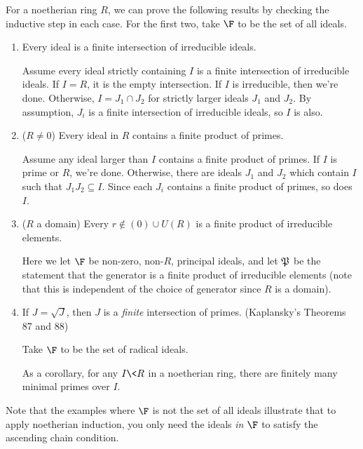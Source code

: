  \begin{example} For a noetherian ring $R$, we can prove the following results by
 checking the inductive step in each case. For the first two, take $\F$ to be the set of
 all ideals.
   \begin{enumerate}
     \item Every ideal is a finite intersection of irreducible ideals.

     Assume every ideal strictly containing $I$ is a finite intersection of irreducible
     ideals. If $I=R$, it is the empty intersection. If $I$ is irreducible, then we're
     done. Otherwise, $I = J_1\cap J_2$ for strictly larger ideals $J_1$ and $J_2$. By
     assumption, $J_i$ is a finite intersection of irreducible ideals, so $I$ is also.

     \item ($R\neq 0$) Every ideal in $R$ contains a finite product of primes.

     Assume any ideal larger than $I$ contains a finite product of primes. If $I$ is
     prime or $R$, we're done. Otherwise, there are ideals $J_1$ and $J_2$ which contain
     $I$ such that $J_1J_2\subseteq I$. Since each $J_i$ contains a finite product of
     primes, so does $I$.

     \item ($R$ a domain) Every $r\not\in (0)\cup U(R)$ is a finite product of
     irreducible elements.

     Here we let $\F$ be non-zero, non-$R$, principal ideals, and let $\P$ be the
     statement that the generator is a finite product of irreducible elements (note that
     this is independent of the choice of generator since $R$ is a domain). 

     \item If $J=\sqrt J$, then $J$ is a \emph{finite} intersection of primes.
     (Kaplansky's Theorems 87 and 88)

     Take $\F$ to be the set of radical ideals.

     As a corollary, for any $I\< R$ in a noetherian ring, there are finitely many
     minimal primes over $I$.
   \end{enumerate}
   \vspace*{-1.7\baselineskip}
 \end{example}
 Note that the examples where $\F$ is not the set of all ideals illustrate that to
 apply noetherian induction, you only need the ideals \emph{in $\F$} to satisfy the
 ascending chain condition.
 \setcounter{lecture}{7}

